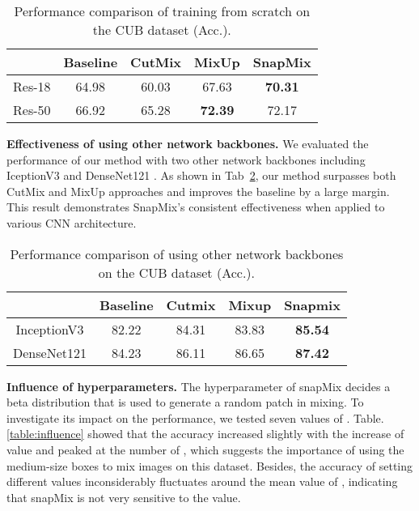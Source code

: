\documentclass[letterpaper]{article} \usepackage{aaai21}  \usepackage{times}  \usepackage{helvet} \usepackage{courier}  \usepackage[hyphens]{url}  \usepackage{graphicx} \urlstyle{rm} \def\UrlFont{\rm}  \usepackage{natbib}  \usepackage{caption} \frenchspacing  \setlength{\pdfpagewidth}{8.5in}  \setlength{\pdfpageheight}{11in}
\begin{document}
  \begin{table}
\caption{Performance comparison of training from scratch on the CUB dataset (Acc.).}
        \begin{center}
            \begin{tabular}{ccccc}
            \toprule
            &Baseline&CutMix&MixUp&SnapMix  \\
             \midrule
             Res-18 & 64.98 & 60.03 & 67.63 & \textbf{70.31} \\
             Res-50 & 66.92 & 65.28 & \textbf{72.39} & 72.17 \\
             \bottomrule
            
            
            \end{tabular}
\end{center}
        \label{table:scratch}
\end{table}

\noindent\textbf{Effectiveness of using other network backbones.} 
 We evaluated the performance of our method with two other network backbones including IceptionV3 \cite{szegedy2016rethinking} and DenseNet121 \cite{huang2017densely}. As shown in Tab~\ref{table:othernet},  our method surpasses both CutMix and MixUp approaches and improves the baseline by a large margin. This result demonstrates SnapMix's consistent effectiveness when applied to various CNN architecture.
  \begin{table}
\caption{Performance comparison of using other network backbones on the CUB dataset (Acc.).}
        \begin{center}
            \begin{tabular}{ccccc}
            \toprule
            &Baseline&Cutmix&Mixup&Snapmix  \\
             \midrule
             InceptionV3 & 82.22 & 84.31 & 83.83 & \textbf{85.54} \\
             DenseNet121 & 84.23 & 86.11 & 86.65 & \textbf{87.42} \\
             \bottomrule
            
            
            \end{tabular}
\end{center}
        \label{table:othernet}
\end{table}


\noindent\textbf{Influence of hyperparameters.}
The hyperparameter  of snapMix decides a beta distribution that is used to generate a random patch in mixing. To investigate its impact on the performance, we tested seven values of .
 Table.\ref{table:influence} showed that the accuracy increased slightly with the increase of  value and peaked at the number of , which suggests the importance of using the medium-size boxes to mix images on this dataset. Besides, the accuracy of setting different  values inconsiderably fluctuates around the mean value of , indicating that snapMix is not very sensitive to the  value.
\end{document}
